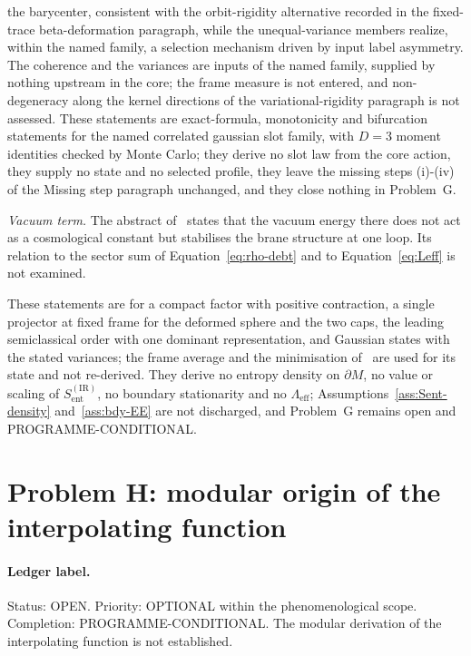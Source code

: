 the barycenter, consistent with the orbit-rigidity alternative recorded in the fixed-trace beta-deformation paragraph, while the unequal-variance members realize, within the named family, a selection mechanism driven by input label asymmetry. The coherence and the variances are inputs of the named family, supplied by nothing upstream in the core; the frame measure is not entered, and non-degeneracy along the kernel directions of the variational-rigidity paragraph is not assessed. These statements are exact-formula, monotonicity and bifurcation statements for the named correlated gaussian slot family, with \(D=3\) moment identities checked by Monte Carlo; they derive no slot law from the core action, they supply no state and no selected profile, they leave the missing steps (i)-(iv) of the Missing step paragraph unchanged, and they close nothing in Problem~G.

\emph{Vacuum term.} The abstract of~\cite{Steinacker2023} states that the vacuum energy there does not act as a cosmological constant but stabilises the brane structure at one loop. Its relation to the sector sum of Equation~\eqref{eq:rho-debt} and to Equation~\eqref{eq:Leff} is not examined.

These statements are for a compact factor with positive contraction, a single projector at fixed frame for the deformed sphere and the two caps, the leading semiclassical order with one dominant representation, and Gaussian states with the stated variances; the frame average and the minimisation of~\cite{FlissFrenkelHartnollSoni2025} are used for its state and not re-derived. They derive no entropy density on \(\partial M\), no value or scaling of \(S_{\mathrm{ent}}^{\mathrm{(IR)}}\), no boundary stationarity and no \(\Lambda_{\mathrm{eff}}\); Assumptions~\ref{ass:Sent-density} and~\ref{ass:bdy-EE} are not discharged, and Problem~G remains open and PROGRAMME-CONDITIONAL.

\section{Problem H: modular origin of the interpolating function}
\label{sec:status-H}

\paragraph{Ledger label.}
Status: OPEN. Priority: OPTIONAL within the phenomenological scope.
Completion: PROGRAMME-CONDITIONAL. The modular derivation of the
interpolating function is not established.

